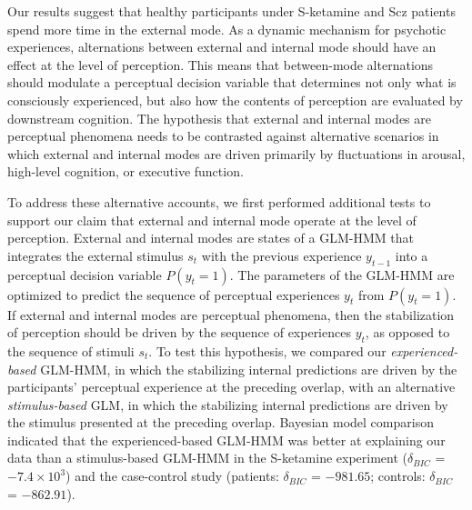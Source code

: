 \documentclass[
]{article}
\begin{document}
Our results suggest that healthy participants under S-ketamine and Scz
patients spend more time in the external mode. As a dynamic mechanism
for psychotic experiences, alternations between external and internal
mode should have an effect at the level of perception. This means that
between-mode alternations should modulate a perceptual decision variable
that determines not only what is consciously experienced, but also how
the contents of perception are evaluated by downstream cognition. The
hypothesis that external and internal modes are perceptual phenomena
needs to be contrasted against alternative scenarios in which external
and internal modes are driven primarily by fluctuations in arousal,
high-level cognition, or executive function.

To address these alternative accounts, we first performed additional
tests to support our claim that external and internal mode operate at
the level of perception. External and internal modes are states of a
GLM-HMM that integrates the external stimulus \(s_t\) with the previous
experience \(y_{t-1}\) into a perceptual decision variable
\(P(y_t = 1)\). The parameters of the GLM-HMM are optimized to predict
the sequence of perceptual experiences \(y_t\) from \(P(y_t = 1)\). If
external and internal modes are perceptual phenomena, then the
stabilization of perception should be driven by the sequence of
experiences \(y_t\), as opposed to the sequence of stimuli \(s_t\). To
test this hypothesis, we compared our \emph{experienced-based} GLM-HMM,
in which the stabilizing internal predictions are driven by the
participants' perceptual experience at the preceding overlap, with an
alternative \emph{stimulus-based} GLM, in which the stabilizing internal
predictions are driven by the stimulus presented at the preceding
overlap. Bayesian model comparison indicated that the experienced-based
GLM-HMM was better at explaining our data than a stimulus-based GLM-HMM
in the S-ketamine experiment (\(\delta_{BIC}\) =
\(\ensuremath{-7.4\times 10^{3}}\)) and the case-control study
(patients: \(\delta_{BIC}\) = \(-981.65\); controls: \(\delta_{BIC}\) =
\(-862.91\)).
\end{document}
